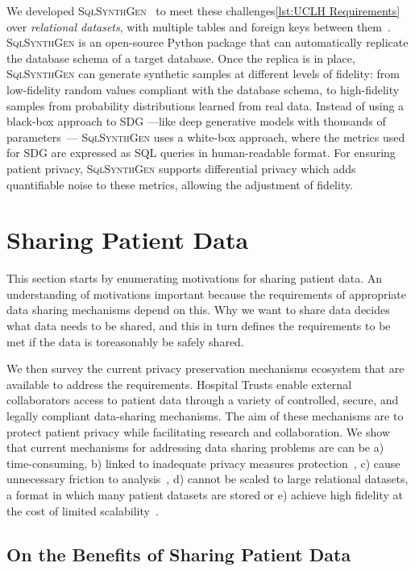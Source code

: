\documentclass[11pt]{article}
\begin{document}
We developed \textsc{SqlSynthGen}~\cite{repository} to meet these challenges\ref{lst:UCLH Requirements} over \emph{relational datasets}, with multiple tables and foreign keys between them~\cite{Cai2023}.
\textsc{SqlSynthGen} is an open-source Python package that can automatically replicate the database schema of a target database.
Once the replica is in place, \textsc{SqlSynthGen} can generate synthetic samples at different levels of fidelity: from low-fidelity random values compliant with the database schema, to high-fidelity samples from probability distributions learned from real data.
Instead of using a black-box approach to SDG ---like deep generative models with thousands of parameters~\cite{DBLP:journals/pami/Bond-TaylorLLW22}--- \textsc{SqlSynthGen} uses a white-box approach, where the metrics used for SDG are expressed as SQL queries in human-readable format.
For ensuring patient privacy, \textsc{SqlSynthGen} supports differential privacy which adds quantifiable noise to these metrics, allowing the adjustment of fidelity.

\section{Sharing Patient Data}

This section starts by enumerating motivations for sharing patient data. An understanding of motivations important because the requirements of appropriate data sharing mechanisms depend on this. Why we want to share data decides what data needs to be shared, and this in turn defines the requirements to be met if the data is toreasonably be safely shared.

We then survey the current privacy preservation mechanisms ecosystem that are available to address the requirements. Hospital Trusts enable external collaborators access to patient data through a variety of controlled, secure, and legally compliant data-sharing mechanisms. The aim of these mechanisms are to protect patient privacy while facilitating research and collaboration. We show that current mechanisms for addressing data sharing problems are can be a) time-consuming, b) linked to inadequate privacy measures protection~\cite{near2021, tucker2020}, c) cause unnecessary friction to analysis~\cite{ODonovan2023}, d) cannot be scaled to large relational datasets, a format in which many patient datasets are stored or e) achieve high fidelity at the cost of limited scalability~\cite{Cai2023}.

\subsection{On the Benefits of Sharing Patient Data}
\end{document}
